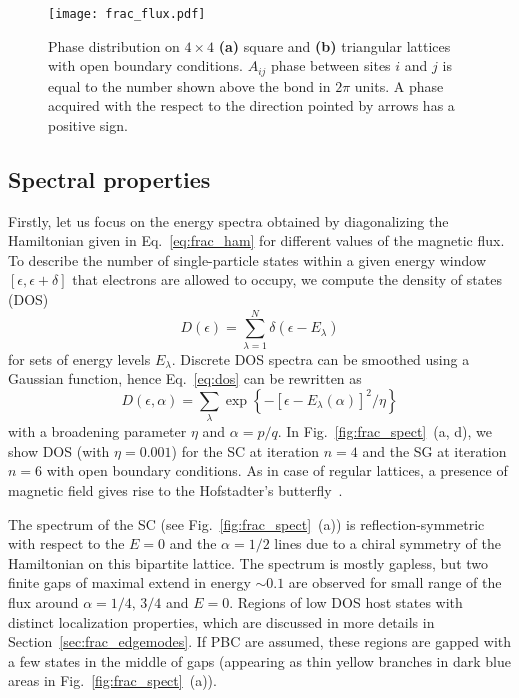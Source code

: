 \begin{figure}[H]
\centering
\texttt{[image: frac\_flux.pdf]} 
\caption[Vector potential gauge choice for fractal lattices]{Phase distribution on $4 \times 4$ \textbf{(a)} square and \textbf{(b)} triangular lattices with open boundary conditions. $A_{ij}$ phase between sites $i$ and $j$ is equal to the number shown above the bond in $2 \pi$ units. A phase acquired with the respect to the direction pointed by arrows has a positive sign.}
\label{fig:flux_distr}
\end{figure}

\subsection{Spectral properties}
\label{sec:frac_spectral}
Firstly, let us focus on the energy spectra obtained by diagonalizing the Hamiltonian given in Eq.~\eqref{eq:frac_ham} for different values of the magnetic flux. To describe the number of single-particle states within a given energy window $[ \epsilon, \epsilon + \delta]$ that electrons are allowed to occupy, we compute the density of states (DOS) 
\begin{equation}
D(\epsilon) = \sum_{\lambda = 1}^N \delta \left (\epsilon - E_{\lambda} \right)
\label{eq:dos}
\end{equation}
for sets of energy levels $E_\lambda$. Discrete DOS spectra can be smoothed using a Gaussian function, hence Eq.~\eqref{eq:dos} can be rewritten as
\begin{equation}
D(\epsilon, \alpha) = \sum_{\lambda} \exp  \left\{ - \left[ \epsilon - E_{\lambda} (\alpha) \right]^2 / \eta \right\}
\label{eq:dos_gauss}
\end{equation}
with a broadening parameter $\eta$ and $\alpha = p /q$. In Fig.~\ref{fig:frac_spect}~(a, d), we show DOS (with $\eta = 0.001$) for the SC at iteration $n = 4$ and the SG at iteration $n = 6$ with open boundary conditions. As in case of regular lattices, a presence of magnetic field gives rise to the Hofstadter's butterfly~\cite{1976:Hofstadter}. 

The spectrum of the SC (see Fig.~\ref{fig:frac_spect}~(a)) is reflection-symmetric with respect to the $E = 0$ and the $\alpha = 1/2$ lines due to a chiral symmetry of the Hamiltonian on this bipartite lattice. The spectrum is mostly gapless, but two finite gaps of maximal extend in energy $\sim 0.1$ are observed for small range of the flux around $\alpha = 1/4, \, 3/4$ and $E = 0$. Regions of low DOS host states with distinct localization properties, which are discussed in more details in Section~\ref{sec:frac_edgemodes}. If PBC are assumed, these regions are gapped with a few states in the middle of gaps (appearing as thin yellow branches in dark blue areas in Fig.~\ref{fig:frac_spect}~(a)).

